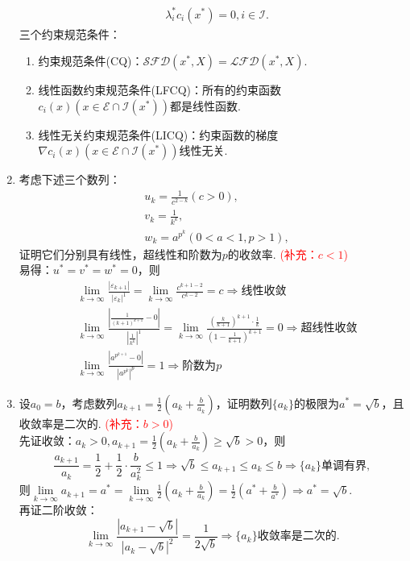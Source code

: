 \begin{enumerate}
\[\begin{array}{ll}
        & \lambda_i^*c_i(x^*) = 0, i \in \mathcal{I}.
    \end{array}\]
    三个约束规范条件：
    \begin{enumerate}[label=(\arabic*)]
        \item 约束规范条件(CQ)：$\mathcal{SFD}(x^*,X)=\mathcal{LFD}(x^*,X)$.
        \item 线性函数约束规范条件(LFCQ)：所有的约束函数$c_i(x) (x \in \mathcal{E} \cap \mathcal{I} (x^*))$都是线性函数.
        \item 线性无关约束规范条件(LICQ)：约束函数的梯度$\nabla c_i(x) (x \in \mathcal{E} \cap \mathcal{I} (x^*))$线性无关.
    \end{enumerate}
    \item 考虑下述三个数列：
    \begin{align*}
        & u_k = \frac{1}{c^{2-k}}(c>0),\\
        & v_k = \frac{1}{k^k},\\
        & w_k = a^{p^k} (0<a<1,p>1),
    \end{align*}
    证明它们分别具有线性，超线性和阶数为$p$的收敛率. \textcolor{red}{(补充：$c<1$)}\\
    \pro 易得：$u^*=v^*=w^*=0$，则\begin{align*}
        & \lim\limits_{k \to \infty} \frac{|\varepsilon_{k+1}|}{|\varepsilon_{k}|^1}=\lim\limits_{k \to \infty} \frac{c^{k+1-2}}{c^{k-2}}=c \Rightarrow \text{线性收敛}\\
        & \lim\limits_{k \to \infty} \frac{\left|\frac{1}{(k+1)^{k+1}}-0\right|}{\left|\frac{1}{k^{k}}\right|^1}=\lim\limits_{k \to \infty} \frac{\left(\frac{k}{k+1}\right)^{k+1} \cdot \frac{1}{k}}{\left(1-\frac{1}{k+1}\right)^{k+1}}=0 \Rightarrow \text{超线性收敛}\\
        & \lim\limits_{k \to \infty} \frac{|a^{p^{k+1}}-0|}{|a^{p^k}|^p}=1 \Rightarrow \text{阶数为}p
    \end{align*}
    \item 设$a_0=b$，考虑数列$\displaystyle a_{k+1}=\frac{1}{2}\left(a_k+\frac{b}{a_k}\right)$，证明数列$\{a_k\}$的极限为$a^*=\sqrt{b}$，且收敛率是二次的. \textcolor{red}{(补充：$b>0$)}\\
    \pro 先证收敛：$\displaystyle a_k>0,a_{k+1}=\frac{1}{2}\left(a_k+\frac{b}{a_k}\right) \geqslant \sqrt{b} >0$，则
    \[\frac{a_{k+1}}{a_k}=\frac{1}{2}+\frac{1}{2}\cdot \frac{b}{a_k^2} \leqslant 1 \Rightarrow \sqrt{b} \leqslant a_{k+1} \leqslant a_k \leqslant b \Rightarrow \{a_k\}\text{单调有界},\]
    则$\displaystyle \lim\limits_{k \to \infty} a_{k+1} = a^*=\lim\limits_{k \to \infty}\frac{1}{2}\left(a_k+\frac{b}{a_k}\right)=\frac{1}{2}\left(a^*+\frac{b}{a^*}\right) \Rightarrow a^* = \sqrt{b}$.\\
    再证二阶收敛：
    \[\lim\limits_{k \to \infty} \frac{|a_{k+1}-\sqrt{b}|}{|a_k-\sqrt{b}|^2}=\frac{1}{2\sqrt{b}} \Rightarrow \{a_k\}\text{收敛率是二次的}.\]
\end{enumerate}
\clearpage

